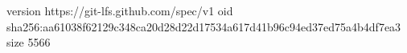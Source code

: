version https://git-lfs.github.com/spec/v1
oid sha256:aa61038f62129c348ca20d28d22d17534a617d41b96c94ed37ed75a4b4df7ea3
size 5566
